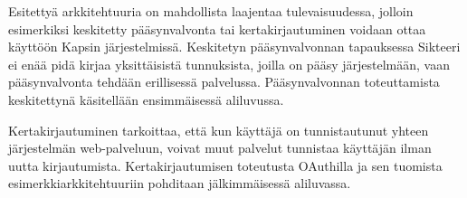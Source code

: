 Esitettyä arkkitehtuuria on mahdollista laajentaa tulevaisuudessa, jolloin esimerkiksi keskitetty pääsynvalvonta tai kertakirjautuminen voidaan ottaa käyttöön Kapsin järjestelmissä. Keskitetyn pääsynvalvonnan tapauksessa Sikteeri ei enää pidä kirjaa yksittäisistä tunnuksista, joilla on pääsy järjestelmään, vaan pääsynvalvonta tehdään erillisessä palvelussa. Pääsynvalvonnan toteuttamista keskitettynä käsitellään ensimmäisessä aliluvussa.

Kertakirjautuminen tarkoittaa, että kun käyttäjä on tunnistautunut yhteen järjestelmän web-palveluun, voivat muut palvelut tunnistaa käyttäjän ilman uutta kirjautumista. Kertakirjautumisen toteutusta OAuthilla ja sen tuomista esimerkkiarkkitehtuuriin pohditaan jälkimmäisessä aliluvassa.